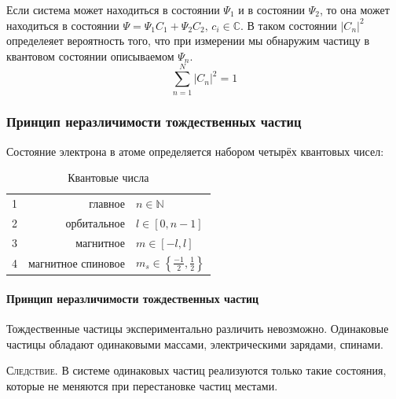 Если система может находиться в состоянии $\Psi_1$ и в состоянии $\Psi_2$, то она может находиться в состоянии $\Psi=\Psi_1C_1+\Psi_2C_2,\,c_i\in\mathbb{C}$. В таком состоянии $\left|C_n\right|^2$ определеяет вероятность того, что при измерении мы обнаружим частицу в квантовом состоянии описываемом $\Psi_n$.
\begin{equation*}
	\sum_{n=1}^{N} \left|C_n\right|^2 = 1
\end{equation*}

\subsubsection{Принцип неразличимости тождественных частиц}\label{princip-nerazlichimosti}
Состояние электрона в атоме определяется набором четырёх квантовых чисел:
\begin{table}[H]
	\begin{center}
		\begin{tabular}{c|r|l}
			1 &            главное & $n\in\mathbb{N}$                                \\[5pt]
			2 &        орбитальное & $l\in[0,n-1]$                                   \\[5pt]
			3 &          магнитное & $m\in[-l,l]$                                    \\[5pt]
			4 & магнитное спиновое & $m_s\in\left\{\frac{-1}{2},\frac{1}{2}\right\}$ \\[5pt]
		\end{tabular}
	\end{center}
	\caption{Квантовые числа}
\end{table}
\paragraph{Принцип неразличимости тождественных частиц} Тождественные частицы экспериментально различить невозможно. Одинаковые частицы обладают одинаковыми массами, электрическими зарядами, спинами.

\textsc{Следствие.} В системе одинаковых частиц реализуются только такие состояния, которые не меняются при перестановке частиц местами.
